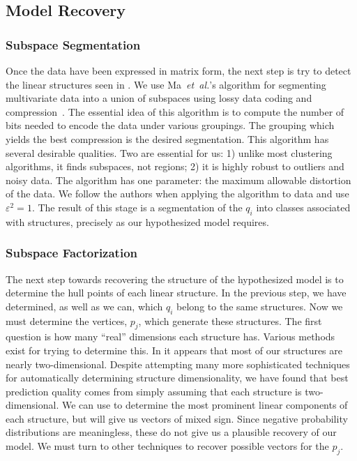 \documentclass{acm_proc_article-sp}
\begin{document}
\subsection{Model Recovery}

\subsubsection{Subspace Segmentation}

Once the data have been expressed in matrix form, the next step is try to detect the linear structures seen in .
We use Ma~\emph{et~al.}'s algorithm for segmenting multivariate data into a union of subspaces using lossy data coding and compression~\cite{Ma07}.
The essential idea of this algorithm is to compute the number of bits needed to encode the data under various groupings.
The grouping which yields the best compression is the desired segmentation.
This algorithm has several desirable qualities.
Two are essential for us:
1) unlike most clustering algorithms, it finds subspaces, not regions;
2) it is highly robust to outliers and noisy data.
The algorithm has one parameter:
the maximum allowable distortion of the data.
We follow the authors when applying the algorithm to  data and use $\varepsilon^2 = 1$.
The result of this stage is a segmentation of the $q_i$ into classes associated with structures, precisely as our hypothesized model requires.

\subsubsection{Subspace Factorization}


The next step towards recovering the structure of the hypothesized model is to determine the hull points of each linear structure.
In the previous step, we have determined, as well as we can, which $q_i$ belong to the same structures.
Now we must determine the vertices, $p_j$, which generate these structures.
The first question is how many ``real'' dimensions each structure has.
Various methods exist for trying to determine this.
In  it appears that most of our structures are nearly two-dimensional.
Despite attempting many more sophisticated techniques for automatically determining structure dimensionality, we have found that best prediction quality comes from simply assuming that each structure is two-dimensional.
We can use  to determine the most prominent linear components of each structure, but  will give us vectors of mixed sign.\svdnnnote
Since negative probability distributions are meaningless, these do not give us a plausible recovery of our model.
We must turn to other techniques to recover possible vectors for the $p_j$.
\end{document}
